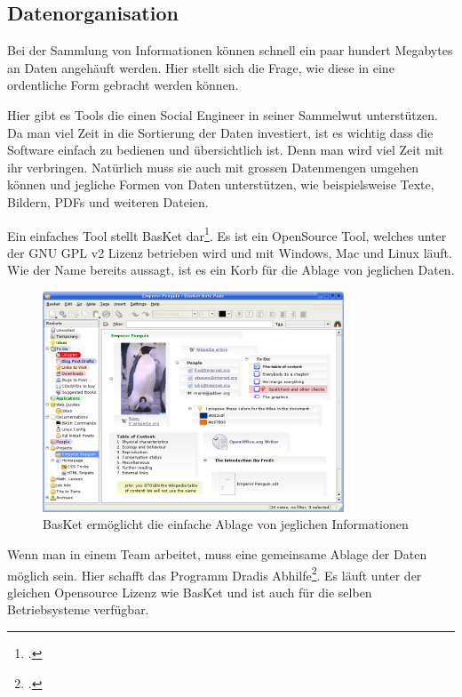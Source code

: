 \subsection{Datenorganisation}
Bei der Sammlung von Informationen können schnell ein paar hundert Megabytes an Daten angehäuft werden. Hier stellt sich die Frage, wie diese in eine ordentliche Form gebracht werden können. 

Hier gibt es Tools die einen Social Engineer in seiner Sammelwut unterstützen. Da man viel Zeit in die Sortierung der Daten investiert, ist es wichtig dass die Software einfach zu bedienen und übersichtlich ist. Denn man wird viel Zeit mit ihr verbringen. Natürlich muss sie auch mit grossen Datenmengen umgehen können und jegliche Formen von Daten unterstützen, wie beispielsweise Texte, Bildern, PDFs und weiteren Dateien. 

Ein einfaches Tool stellt BasKet dar\footcite{BasKet_Note_Pads_2015-06-29}. Es ist ein OpenSource Tool, welches unter der GNU GPL v2 Lizenz betrieben wird und mit Windows, Mac und Linux läuft. Wie der Name bereits aussagt, ist es ein Korb für die Ablage von jeglichen Daten.

\begin{figure}[htb]
  \centering
  \includegraphics[width=0.8\textwidth]{images/basket.png}
  \caption[BasKet ermöglicht die einfache Ablage von jeglichen Informationen]{BasKet ermöglicht die einfache Ablage von jeglichen Informationen}
  \label{fig:socialengineering:informationssammlung:datenorganisation:basket}
\end{figure}

Wenn man in einem Team arbeitet, muss eine gemeinsame Ablage der Daten möglich sein. Hier schafft das Programm Dradis Abhilfe\footcite{dradis__Freecode_2015-06-29}. Es läuft unter der gleichen Opensource Lizenz wie BasKet und ist auch für die selben Betriebsysteme verfügbar. 

